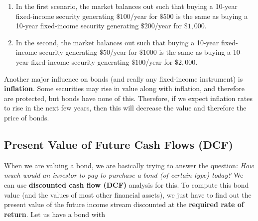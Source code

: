\documentclass{article}
\begin{document}
    \begin{enumerate}
      \item In the first scenario, the market balances out such that buying a 10-year fixed-income security generating $\$100$/year for $\$500$ is the same as buying a 10-year fixed-income security generating $\$200$/year for $\$1,000$.
      \item In the second, the market balances out such that buying a 10-year fixed-income security generating $\$50$/year for $\$1000$ is the same as buying a 10-year fixed-income security generating $\$100$/year for $\$2,000$.
    \end{enumerate}

    Another major influence on bonds (and really any fixed-income instrument) is \textbf{inflation}. Some securities may rise in value along with inflation, and therefore are protected, but bonds have none of this. Therefore, if we expect inflation rates to rise in the next few years, then this will decrease the value and therefore the price of bonds.

  \subsection{Present Value of Future Cash Flows (DCF)}

    When we are valuing a bond, we are basically trying to answer the question: \textit{How much would an investor to pay to purchase a bond (of certain type) today?} We can use \textbf{discounted cash flow (DCF)} analysis for this. To compute this bond value (and the values of most other financial assets), we just have to find out the present value of the future income stream discounted at the \textbf{required rate of return}. Let us have a bond with
\end{document}
